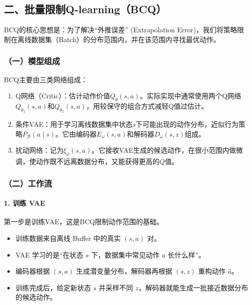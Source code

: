 \hypertarget{ux4e8cux6279ux91cfux9650ux5236q-learningbcq}{%
\subsection{二、批量限制Q-learning（BCQ）}\label{ux4e8cux6279ux91cfux9650ux5236q-learningbcq}}

BCQ的核心思想是：为了解决``外推误差'' (Extrapolation Error)，我们将策略限制在离线数据集（Batch）的分布范围内，并在该范围内寻找最优动作。

\hypertarget{ux4e00ux6a21ux578bux7ec4ux6210}{%
\subsubsection{（一）模型组成}\label{ux4e00ux6a21ux578bux7ec4ux6210}}

BCQ主要由三类网络组成：

\begin{enumerate}
\def\labelenumi{\arabic{enumi}.}
\tightlist
\item
  Q网络（Critic）：估计动作价值\(Q_\theta(s,a)\)。实际实现中通常使用两个Q网络\(Q_{\theta_1}(s,a)\)和\(Q_{\theta_2}(s,a)\)，用较保守的组合方式减轻Q值过估计。
\item
  条件VAE：用于学习离线数据集中状态\(s\)下可能出现的动作分布，近似行为策略\(P_{\mathcal B}(a \mid s)\)。它由编码器\(E_\omega(s,a)\)和解码器\(D_\omega(s,z)\)组成。
\item
  扰动网络：记为\(\xi_\phi(s,a)\)。它接收VAE生成的候选动作，在很小范围内做微调，使动作既不远离数据分布，又能获得更高的\(Q\)值。
\end{enumerate}

\hypertarget{ux4e8cux5de5ux4f5cux6d41}{%
\subsubsection{（二）工作流}\label{ux4e8cux5de5ux4f5cux6d41}}

\hypertarget{ux8badux7ec3-vae}{%
\paragraph{1. 训练 VAE}\label{ux8badux7ec3-vae}}

第一步是训练VAE，这是BCQ限制动作范围的基础。

\begin{itemize}
\tightlist
\item
  训练数据来自离线 Buffer 中的真实 \((s,a)\) 对。
\item
  VAE 学习的是``在状态 \(s\) 下，数据集中常见动作 \(a\) 长什么样''。
\item
  编码器根据 \((s,a)\) 生成潜变量分布，解码器再根据 \((s,z)\) 重构动作 \(\hat{a}\)。
\item
  训练完成后，给定新状态 \(s\) 并采样不同 \(z\)，解码器就能生成一批接近数据分布的候选动作。
\end{itemize}

